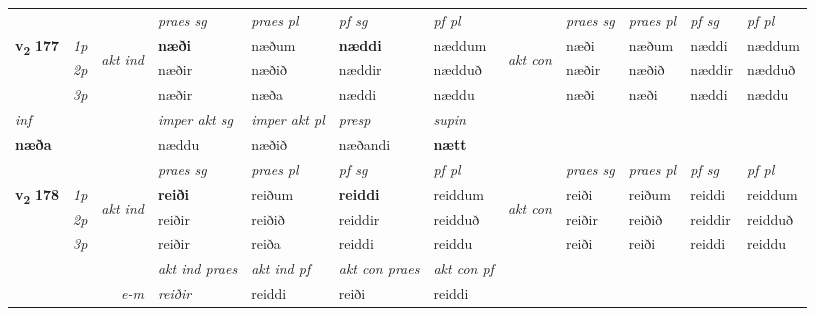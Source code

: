 \begin{longtable}[l]{X>{\footnotesize\itshape}llXXXXlXXXX}
 & &   & \textit{praes sg}  & \textit{praes pl}    & \textit{ pf sg} & \textit{pf pl} & & \textit{praes sg}  & \textit{praes pl}    & \textit{pf sg} & \textit{pf pl }  \\ \cmidrule{4-7} \cmidrule{9-12}
 \multirow{2}{*}{{{\textbf{v{\textsubscript{2}}} \Large{\textbf{177}}}}}  & 1p & \multirow{3}{*}{\begin{turn}{90}\textit{akt ind}\end{turn}} & \textbf{næði} & næðum & \textbf{næddi} & næddum & \multirow{3}{*}{\begin{turn}{90}\textit{akt con}\end{turn}} &næði & næðum & næddi & næddum\\*
 & 2p &  &  næðir  & næðið & næddir & nædduð & & næðir & næðið & næddir & nædduð \\*
 & 3p &  & næðir & næða & næddi & næddu & & næði & næði& næddi & næddu \\*
\cmidrule{4-7} \cmidrule{9-12}

   {\textit{inf}} & &  & \textit{imper akt sg} & \textit{imper akt pl}   & \textit{presp} & \textit{supin}   \\*
  {\textbf{næða}} & && næddu  & næðið   & næðandi &  \textbf{nætt}   \\*

\midrule

 & &   & \textit{praes sg}  & \textit{praes pl}    & \textit{ pf sg} & \textit{pf pl} & & \textit{praes sg}  & \textit{praes pl}    & \textit{pf sg} & \textit{pf pl }  \\ \cmidrule{4-7} \cmidrule{9-12}
 \multirow{2}{*}{{{\textbf{v{\textsubscript{2}}} \Large{\textbf{178}}}}}  & 1p & \multirow{3}{*}{\begin{turn}{90}\textit{akt ind}\end{turn}} & \textbf{reiði} & reiðum & \textbf{reiddi} & reiddum & \multirow{3}{*}{\begin{turn}{90}\textit{akt con}\end{turn}} &reiði & reiðum & reiddi & reiddum\\*
 & 2p &  &  reiðir  & reiðið & reiddir & reidduð & & reiðir & reiðið & reiddir & reidduð \\*
 & 3p &  & reiðir & reiða & reiddi & reiddu & & reiði & reiði& reiddi & reiddu \\*
\cmidrule{4-7} \cmidrule{9-12}

   && &  \textit{akt ind praes} & \textit{akt ind pf} & \textit{akt con praes} & \textit{akt con pf} \\*
\multicolumn{3}{r}{\textit{e-m}} & reiðir & reiddi & reiði & reiddi \\*


\end{longtable}
